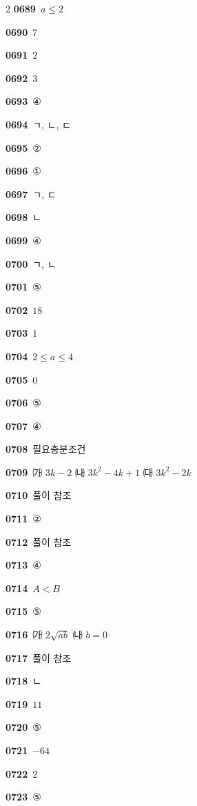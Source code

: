 \documentclass[10pt,a4paper]{article}
\begin{document}
\begin{multicols}{2}
\noindent\textbf{0689}\ $a\le 2$\par
\noindent\textbf{0690}\ $7$\par
\noindent\textbf{0691}\ $2$\par
\noindent\textbf{0692}\ $3$\par
\noindent\textbf{0693}\ ④\par
\noindent\textbf{0694}\ ㄱ, ㄴ, ㄷ\par
\noindent\textbf{0695}\ ②\par
\noindent\textbf{0696}\ ①\par
\noindent\textbf{0697}\ ㄱ, ㄷ\par
\noindent\textbf{0698}\ ㄴ\par
\noindent\textbf{0699}\ ④\par
\noindent\textbf{0700}\ ㄱ, ㄴ\par
\noindent\textbf{0701}\ ⑤\par
\noindent\textbf{0702}\ $18$\par
\noindent\textbf{0703}\ $1$\par
\noindent\textbf{0704}\ $2\le a\le 4$\par
\noindent\textbf{0705}\ $0$\par
\noindent\textbf{0706}\ ⑤\par
\noindent\textbf{0707}\ ④\par
\noindent\textbf{0708}\ 필요충분조건\par
\noindent\textbf{0709}\ ㈎ $3k-2$ \quad ㈏ $3k^2-4k+1$ \quad ㈐ $3k^2-2k$\par
\noindent\textbf{0710}\ 풀이 참조\par
\noindent\textbf{0711}\ ②\par
\noindent\textbf{0712}\ 풀이 참조\par
\noindent\textbf{0713}\ ④\par
\noindent\textbf{0714}\ $A<B$\par
\noindent\textbf{0715}\ ⑤\par
\noindent\textbf{0716}\ ㈎ $2\sqrt{ab}$ \quad ㈏ $b=0$\par
\noindent\textbf{0717}\ 풀이 참조\par
\noindent\textbf{0718}\ ㄴ\par
\noindent\textbf{0719}\ $11$\par
\noindent\textbf{0720}\ ⑤\par
\noindent\textbf{0721}\ $-64$\par
\noindent\textbf{0722}\ $2$\par
\noindent\textbf{0723}\ ⑤\par

\end{multicols}
\end{document}
